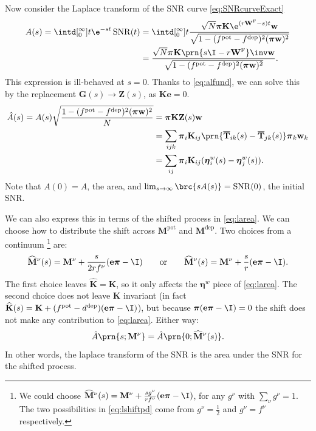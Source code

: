 \documentclass[12pt]{article}
\newcommand{\onev}{\mathbf{e}}
\newcommand{\eq}{\pib}
\newcommand{\fpt}{\mathbf{T}}
\newcommand{\fptb}{\overline{\fpt}}
\newcommand{\fund}{\mathbf{Z}}
\newcommand{\pib}{\boldsymbol{\pi}}
\newcommand{\etw}{\boldsymbol{\eta}^w}
\newcommand{\w}{\mathbf{w}}
\newcommand{\W}{\mathbf{W}}
\newcommand{\M}{\mathbf{M}}
\newcommand{\enc}{\mathbf{K}}
\newcommand{\frg}{\W^{\mathrm{F}}}
\newcommand{\pot}{^{\text{pot}}}
\newcommand{\dep}{^{\text{dep}}}
\DeclareMathOperator{\SNR}{SNR}
\newcommand{\shift}[1]{\widehat{#1}}
\begin{document}
Now consider the Laplace transform of the SNR curve \eqref{eq:SNRcurveExact}
%
\begin{equation}\label{eq:lsnr}
\begin{aligned}
  A(s) = \intd[_0^{\infty}]{t} \e^{-st}\SNR(t) 
   &= \intd[_0^{\infty}]{t} \frac{ \sqrt{N} \eq \enc \e^{(r\frg-s)t} \w }
                                { \sqrt{1-(f\pot-f\dep)^2(\eq\w)^2} } \\
   &= \frac{\sqrt{N} \eq \enc \prn{s \I - r\frg}\inv \w }{\sqrt{1-(f\pot-f\dep)^2(\eq\w)^2}}.
\end{aligned}
\end{equation}
%
This expression is ill-behaved at $s=0$.
Thanks to \eqref{eq:alfund}, we can solve this by the replacement $\mathbf{G}(s) \to \fund(s)$, as $\enc\onev=0$.
%
\begin{equation}\label{eq:larea}
\begin{aligned}
  \hat{A}(s) = A(s) \sqrt{\frac{{{1-(f\pot-f\dep)^2(\eq\w)^2}}}{N}}  &=  \eq \enc \fund(s) \w \\
    &= \sum_{ijk} \eq_i \enc_{ij} \prn{\fptb_{ik}(s)-\fptb_{jk}(s)} \eq_k \w_k \\
    &= \sum_{ij}  \eq_i \enc_{ij} (\etw_{i}(s) - \etw_{j}(s)).
\end{aligned}
\end{equation}
%
Note that $A(0)=A$, the area, and $\lim_{s\to\infty} \brc{sA(s)} = \SNR(0)$, the initial SNR.

We can also express this in terms of the shifted process in \cref{eq:larea}.
We can choose how to distribute the shift across \(\M\pot\) and \(\M\dep\).
Two choices from a continuum%
\footnote{We could choose \( \shift{\M}^\nu(s) = \M^\nu + \frac{s g^\nu}{r f^\nu} (\onev \eq - \I) \), for any \(g^\nu \) with \( \sum_\nu g^\nu = 1 \).
The two possibilities in \cref{eq:lshiftpd} come from \(g^\nu = \frac{1}{2}\) and \(g^\nu = f^\nu\) respectively.}
are:
%
\begin{equation}\label{eq:lshiftpd}
  \shift{\M}^\nu(s) = \M^\nu + \frac{s}{2 r f^\nu} (\onev \eq - \I)
  \qquad \text{or} \qquad
  \shift{\M}^\nu(s) = \M^\nu + \frac{s}{r} (\onev \eq - \I).
\end{equation}
%
The first choice leaves \( \shift{\enc} = \enc \), so it only affects the \(\etw\) piece of \cref{eq:larea}.
The second choice does not leave \(\enc\) invariant (in fact \( \shift{\enc}(s) = \enc + (f\pot - d\dep) (\onev \eq - \I) \)), but because \( \eq (\onev \eq - \I) = 0 \) the shift does not make any contribution to \cref{eq:larea}.
Either way:
%
\begin{equation}\label{eq:lareashift}
  \hat{A}\prn{s; \M^\nu} = \hat{A}\prn{0; \shift{\M}^\nu(s)}.
\end{equation}
%
In other words, the laplace transform of the SNR is the area under the SNR for the shifted process.
\end{document}
